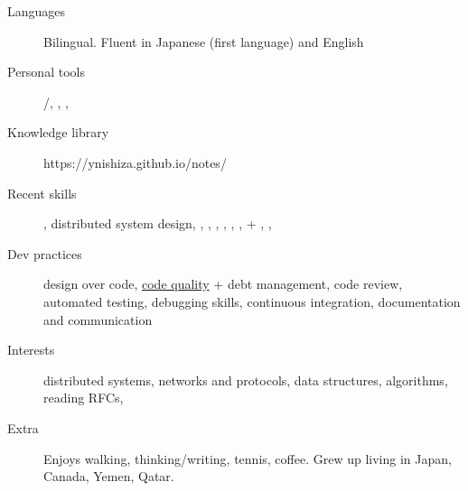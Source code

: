 \begin{description}
  \liststyle
  \item[Languages]{Bilingual. Fluent in Japanese (first language) and English}
  \item[Personal tools]{\rfneovim /\rfvim, \rfbash, \rfgit, \rftmux }
  \item[Knowledge library]{https://ynishiza.github.io/notes/}
  \item[Recent skills]{\rfnodejs, distributed system design, \rfmongodb, \rfredis, \rfneofj, \rfdocker, \rfreact, \rfcypress, \rfgit + \rfgithub, \rfaws, \rfjenkins }
  \item[Dev practices]{design over code, \href{https://ynishiza.github.io/codingprinciples}{code quality} + debt management, code review, automated testing, debugging skills, continuous integration, documentation and communication }
  \item[Interests]{distributed systems, networks and protocols, data structures, algorithms, reading RFCs, \rfhaskell }
  \item[Extra]{Enjoys walking, thinking/writing, tennis, coffee. Grew up living in Japan, Canada, Yemen, Qatar.}
\end{description}

